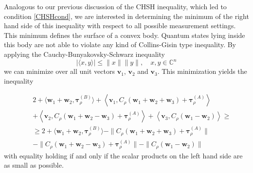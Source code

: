 \documentclass[12pt]{iopart}
\begin{document}
Analogous to our previous discussion of the CHSH inequality, which led to condition \eqref{CHSHcond}, we are interested in determining the minimum of the right hand side of this inequality with respect to  all possible measurement settings. This minimum defines the surface 
of a convex body. Quantum states lying inside this body are not able to violate any kind of Collins-Gisin type inequality. By applying the Cauchy-Bunyakovsky-Schwarz inequality
\begin{equation}
 |\langle x,y \rangle| \leqslant \|x\| \|y\|, \quad x,y \in \mathbb{C}^n \nonumber
\end{equation}
we can minimize over all unit vectors $\bm{v}_1$, $\bm{v}_2$ and $\bm{v}_3$. This minimization yields the inequality

\begin{eqnarray}
 &&2 +  \langle \bm{w}_1 +\bm{w}_2, \bm{\tau}^{(B)}_{\rho} \rangle + \left\langle \bm{v}_1, C_{\rho} \left(\bm{w}_1 +\bm{w}_2 +\bm{w}_3 \right) + \bm{\tau}^{(A)}_{\rho} \right\rangle  \nonumber \\ 
 &&+\left\langle \bm{v}_2, C_{\rho} \left(\bm{w}_1 +\bm{w}_2 -\bm{w}_3 \right) + \bm{\tau}^{(A)}_{\rho} \right\rangle 
 + \left\langle \bm{v}_3, C_{\rho} \left(\bm{w}_1 -\bm{w}_2 \right) \right\rangle \geqslant \nonumber \\ 
  &&\geqslant 2 +  \langle \bm{w}_1 +\bm{w}_2, \bm{\tau}^{(B)}_{\rho} \rangle - \|C_{\rho} \left(\bm{w}_1 +\bm{w}_2 +\bm{w}_3 \right) + \bm{\tau}^{(A)}_{\rho}\| \nonumber \\
  &&-\|C_{\rho} \left(\bm{w}_1 +\bm{w}_2 -\bm{w}_3 \right) + \bm{\tau}^{(A)}_{\rho}\|
 -\|C_{\rho} \left(\bm{w}_1 -\bm{w}_2\right)\| \label{CGnum}
\end{eqnarray}
with equality holding if and only if the scalar products on the left hand side are as small as possible.
\end{document}
